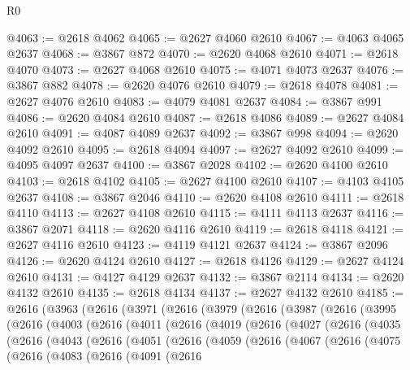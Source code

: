 \begin{lexlean}{R0}
\begin{coremodule}
@4063 := @2618 @4062
@4065 := @2627 @4060 @2610
@4067 := @4063 @4065 @2637
@4068 := @3867 @872
@4070 := @2620 @4068 @2610
@4071 := @2618 @4070
@4073 := @2627 @4068 @2610
@4075 := @4071 @4073 @2637
@4076 := @3867 @882
@4078 := @2620 @4076 @2610
@4079 := @2618 @4078
@4081 := @2627 @4076 @2610
@4083 := @4079 @4081 @2637
@4084 := @3867 @991
@4086 := @2620 @4084 @2610
@4087 := @2618 @4086
@4089 := @2627 @4084 @2610
@4091 := @4087 @4089 @2637
@4092 := @3867 @998
@4094 := @2620 @4092 @2610
@4095 := @2618 @4094
@4097 := @2627 @4092 @2610
@4099 := @4095 @4097 @2637
@4100 := @3867 @2028
@4102 := @2620 @4100 @2610
@4103 := @2618 @4102
@4105 := @2627 @4100 @2610
@4107 := @4103 @4105 @2637
@4108 := @3867 @2046
@4110 := @2620 @4108 @2610
@4111 := @2618 @4110
@4113 := @2627 @4108 @2610
@4115 := @4111 @4113 @2637
@4116 := @3867 @2071
@4118 := @2620 @4116 @2610
@4119 := @2618 @4118
@4121 := @2627 @4116 @2610
@4123 := @4119 @4121 @2637
@4124 := @3867 @2096
@4126 := @2620 @4124 @2610
@4127 := @2618 @4126
@4129 := @2627 @4124 @2610
@4131 := @4127 @4129 @2637
@4132 := @3867 @2114
@4134 := @2620 @4132 @2610
@4135 := @2618 @4134
@4137 := @2627 @4132 @2610
@4185 := @2616
    (@3963
      (@2616
        (@3971
          (@2616
            (@3979
              (@2616
                (@3987
                  (@2616
                    (@3995
                      (@2616
                        (@4003
                          (@2616
                            (@4011
                              (@2616
                                (@4019
                                  (@2616
                                    (@4027
                                      (@2616
                                        (@4035
                                          (@2616
                                            (@4043
                                              (@2616
                                                (@4051
                                                  (@2616
                                                    (@4059
                                                      (@2616
                                                        (@4067
                                                          (@2616
                                                            (@4075
                                                              (@2616
                                                                (@4083
                                                                  (@2616
                                                                    (@4091
                                                                      (@2616

\end{coremodule}
\end{lexlean}

